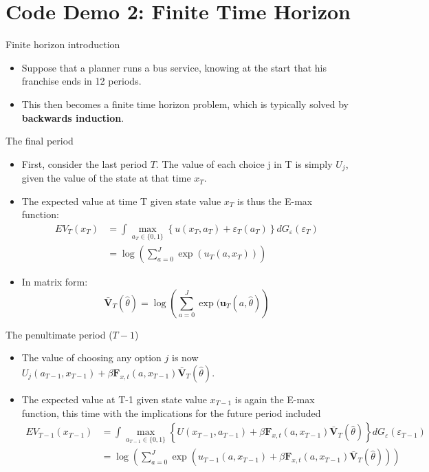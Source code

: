 \documentclass[aspectratio=169]{beamer}
\begin{document}
	\section{Code Demo 2: Finite Time Horizon}
	\begin{frame}{Finite horizon introduction}
		\begin{itemize}
			\itemsep1em
			\item Suppose that a planner runs a bus service, knowing at the start that his franchise ends in 12 periods.
			\item This then becomes a finite time horizon problem, which is typically solved by \textbf{backwards induction}.
		\end{itemize}
	\end{frame}
	\begin{frame}{The final period}
		\begin{itemize}
			\item First, consider the last period $T$. The value of each choice j in T is simply $U_j$, given the value of the state at that time $x_T$. 
			\item The expected value at time T given state value $x_T$ is thus the E-max function:
			\begin{align}
				EV_T(x_T) &= \int \max_{a_T \in \{0,1\}} \left\{ u(x_T,a_T) + \varepsilon_T(a_T) \right\} dG_\varepsilon(\varepsilon_T) \\
				&= \log \left(\sum_{a=0}^J \exp(u_T(a,x_T))\right)
			\end{align}
			\item In matrix form:
			\begin{equation}
				\bar{\bm{V}}_T(\hat{\theta}) = \log \left( \sum_{a=0}^J \exp(\bm{u}_T(a,\hat{\theta}) \right)
			\end{equation}
		\end{itemize}
	\end{frame}
	
	\begin{frame}{The penultimate period ($T-1$)}
		\begin{itemize}
			\itemsep1em
			\item The value of choosing any option $j$ is now $U_j(a_{T-1},x_{T-1}) + \beta \bm{F}_{x,t}(a,x_{T-1}) \bar{\bm{V}}_{T}(\hat{\theta})$.
			\item The expected value at T-1 given state value $x_{T-1}$ is again the E-max function, this time with the implications for the future period included
			\begin{align}
				EV_{T-1}(x_{T-1}) &= \int \max_{a_{T-1} \in \{0,1\}} \left\{ U(x_{T-1},a_{T-1}) + \beta \bm{F}_{x,t}(a,x_{T-1}) \bar{\bm{V}}_{T}(\hat{\theta}) \right\} dG_\varepsilon(\varepsilon_{T-1}) \\
				&= \log \left(\sum_{a=0}^J \exp(u_{T-1}(a,x_{T-1}) + \beta \bm{F}_{x,t}(a,x_{T-1}) \bar{\bm{V}}_{T}(\hat{\theta}))\right)
			\end{align}
		\end{itemize}
	\end{frame}
	
\end{document}
